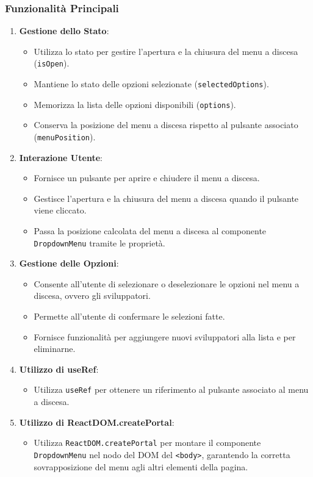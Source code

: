 \documentclass{article}
\begin{document}
\subsubsection*{Funzionalità Principali}

\begin{enumerate}
    \item \textbf{Gestione dello Stato}:
    \begin{itemize}
        \item Utilizza lo stato per gestire l'apertura e la chiusura del menu a discesa (\texttt{isOpen}).
        \item Mantiene lo stato delle opzioni selezionate (\texttt{selectedOptions}).
        \item Memorizza la lista delle opzioni disponibili (\texttt{options}).
        \item Conserva la posizione del menu a discesa rispetto al pulsante associato (\texttt{menuPosition}).
    \end{itemize}
    
    \item \textbf{Interazione Utente}:
    \begin{itemize}
        \item Fornisce un pulsante per aprire e chiudere il menu a discesa.
        \item Gestisce l'apertura e la chiusura del menu a discesa quando il pulsante viene cliccato.
        \item Passa la posizione calcolata del menu a discesa al componente \texttt{DropdownMenu} tramite le proprietà.
    \end{itemize}
    
    \item \textbf{Gestione delle Opzioni}:
    \begin{itemize}
        \item Consente all'utente di selezionare o deselezionare le opzioni nel menu a discesa, ovvero gli sviluppatori.
        \item Permette all'utente di confermare le selezioni fatte.
        \item Fornisce funzionalità per aggiungere nuovi sviluppatori alla lista e per eliminarne.
    \end{itemize}
    
    \item \textbf{Utilizzo di useRef}:
    \begin{itemize}
        \item Utilizza \texttt{useRef} per ottenere un riferimento al pulsante associato al menu a discesa.
    \end{itemize}
    
    \item \textbf{Utilizzo di ReactDOM.createPortal}:
    \begin{itemize}
        \item Utilizza \texttt{ReactDOM.createPortal} per montare il componente \texttt{DropdownMenu} nel nodo del DOM del \texttt{<body>}, garantendo la corretta sovrapposizione del menu agli altri elementi della pagina.
    \end{itemize}
\end{enumerate}
\end{document}
